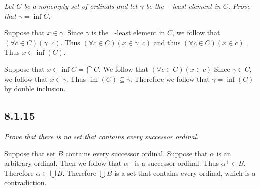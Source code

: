 \documentclass[11pt,oneside,titlepage]{book}
\DeclareMathOperator \ineq {\underline{\in}}
\begin{document}
\textit{Let $C$ be a nonempty set of ordinals and let $\gamma$ be the $\ineq$-least
  element in $C$. Prove that $\gamma = \inf C$.}

Suppose that $x \in \gamma$. Since $\gamma$ is the $\ineq$-least
element in $C$, we follow that $(\forall c \in C)(\gamma \ineq c)$. Thus
$(\forall c \in C)(x \in \gamma \ineq c)$ and thus $(\forall c \in C)(x \in c)$. Thus
$x \in \inf(C)$.

Suppose that $x \in \inf C = \bigcap{C}$. We follow that $(\forall c \in C)(x \in c)$
Since $\gamma \in C$, we follow that $x \in \gamma$. Thus $\inf(C) \subseteq \gamma$.
Therefore we follow that $\gamma = \inf(C)$ by double inclusion.

\subsection*{8.1.15}

\textit{Prove that there is no set that contains every successor ordinal.}

Suppose that set $B$ contains every successor ordinal. Suppose that $\alpha$ is an
arbitrary ordinal. Then we follow that $\alpha^+$ is a successor ordinal. Thus
$\alpha^+ \in B$. Therefore $\alpha \in \bigcup{B}$. Therefore $\bigcup{B}$
is a set that contains every ordinal, which is a contradiction.
\end{document}
